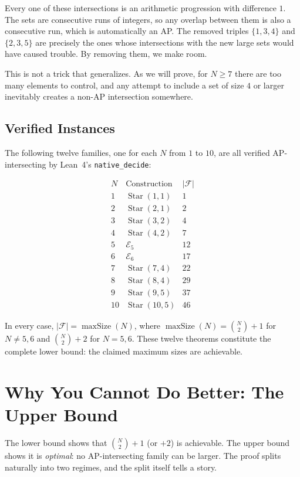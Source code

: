 \documentclass[11pt,a4paper]{article}
\theoremstyle{definition}
\newcommand{\CN}{\binom{N}{2}}
\begin{document}
Every one of these intersections is an arithmetic progression with difference $1$.
The sets are consecutive runs of integers, so any overlap between them is also a
consecutive run, which is automatically an AP. The removed triples $\{1,3,4\}$ and
$\{2,3,5\}$ are precisely the ones whose intersections with the new large sets would
have caused trouble. By removing them, we make room.

This is not a trick that generalizes. As we will prove, for $N \geq 7$ there are too
many elements to control, and any attempt to include a set of size $4$ or larger
inevitably creates a non-AP intersection somewhere.

\subsection{Verified Instances}

The following twelve families, one for each $N$ from $1$ to $10$, are all verified
AP-intersecting by Lean~4's \texttt{native\_decide}:

\[
\begin{array}{c|c|c}
N & \text{Construction} & |\mathcal{F}| \\ \hline
1 & \operatorname{Star}(1,1) & 1 \\
2 & \operatorname{Star}(2,1) & 2 \\
3 & \operatorname{Star}(3,2) & 4 \\
4 & \operatorname{Star}(4,2) & 7 \\
5 & \mathcal{E}_5 & 12 \\
6 & \mathcal{E}_6 & 17 \\
7 & \operatorname{Star}(7,4) & 22 \\
8 & \operatorname{Star}(8,4) & 29 \\
9 & \operatorname{Star}(9,5) & 37 \\
10 & \operatorname{Star}(10,5) & 46
\end{array}
\]

In every case, $|\mathcal{F}| = \operatorname{maxSize}(N)$, where
$\operatorname{maxSize}(N) = \CN + 1$ for $N \neq 5,6$ and $\CN + 2$ for
$N = 5,6$. These twelve theorems constitute the complete lower bound: the claimed
maximum sizes are achievable.


\section{Why You Cannot Do Better: The Upper Bound}

The lower bound shows that $\CN + 1$ (or $+2$) is achievable. The upper bound shows
it is \emph{optimal}: no AP-intersecting family can be larger. The proof splits
naturally into two regimes, and the split itself tells a story.
\end{document}
